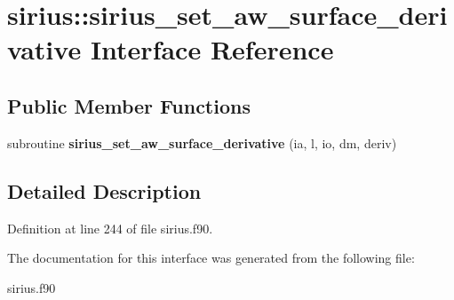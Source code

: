 \hypertarget{interfacesirius_1_1sirius__set__aw__surface__derivative}{}\section{sirius\+:\+:sirius\+\_\+set\+\_\+aw\+\_\+surface\+\_\+derivative Interface Reference}
\label{interfacesirius_1_1sirius__set__aw__surface__derivative}
\subsection*{Public Member Functions}
\begin{DoxyCompactItemize}
\item 
\hypertarget{interfacesirius_1_1sirius__set__aw__surface__derivative_a54274e51ec88b8246185c3312b07c56f}{}subroutine {\bfseries sirius\+\_\+set\+\_\+aw\+\_\+surface\+\_\+derivative} (ia, l, io, dm, deriv)\label{interfacesirius_1_1sirius__set__aw__surface__derivative_a54274e51ec88b8246185c3312b07c56f}

\end{DoxyCompactItemize}


\subsection{Detailed Description}


Definition at line 244 of file sirius.\+f90.



The documentation for this interface was generated from the following file\+:\begin{DoxyCompactItemize}
\item 
sirius.\+f90\end{DoxyCompactItemize}
